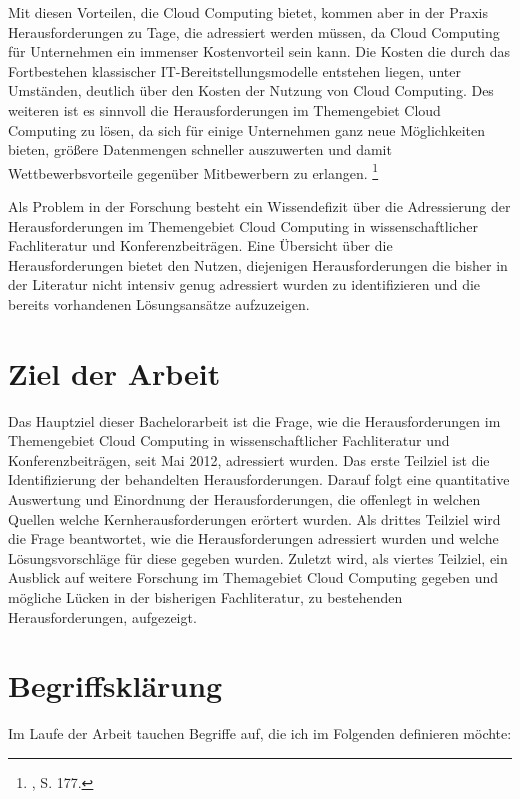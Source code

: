 \documentclass[
	a4paper,
	oneside,
	12pt,
	liststotocnumbered
]{article}
\let\cite\textcite
\begin{document}
Mit diesen Vorteilen, die Cloud Computing bietet, kommen aber in der Praxis Herausforderungen zu Tage, die adressiert werden müssen, da Cloud Computing für Unternehmen ein immenser Kostenvorteil sein kann. Die Kosten die durch das Fortbestehen klassischer IT-Bereitstellungsmodelle entstehen liegen, unter Umständen, deutlich über den Kosten der Nutzung von Cloud Computing. Des weiteren ist es sinnvoll die Herausforderungen im Themengebiet Cloud Computing zu lösen, da sich für einige Unternehmen ganz neue Möglichkeiten bieten, größere Datenmengen schneller auszuwerten und damit Wettbewerbsvorteile gegenüber Mitbewerbern zu erlangen.
\footnote{\cite{Marston.2011}, S. 177.}

Als Problem in der Forschung besteht ein Wissendefizit über die Adressierung der Herausforderungen im Themengebiet Cloud Computing in wissenschaftlicher Fachliteratur und Konferenzbeiträgen. Eine Übersicht über die Herausforderungen bietet den Nutzen, diejenigen Herausforderungen die bisher in der Literatur nicht intensiv genug adressiert wurden zu identifizieren und die bereits vorhandenen Lösungsansätze aufzuzeigen.



\section{Ziel der Arbeit}
Das Hauptziel dieser Bachelorarbeit ist die Frage, wie die Herausforderungen im Themengebiet Cloud Computing in wissenschaftlicher Fachliteratur und Konferenzbeiträgen, seit Mai 2012, adressiert wurden.
Das erste Teilziel ist die Identifizierung der behandelten Herausforderungen. Darauf folgt eine quantitative Auswertung und Einordnung der Herausforderungen, die offenlegt in welchen Quellen welche Kernherausforderungen erörtert wurden.
Als drittes Teilziel wird die Frage beantwortet, wie die Herausforderungen adressiert wurden und welche Lösungsvorschläge für diese gegeben wurden. Zuletzt wird, als viertes Teilziel, ein Ausblick auf weitere Forschung im Themagebiet Cloud Computing gegeben und mögliche Lücken in der bisherigen Fachliteratur, zu bestehenden Herausforderungen, aufgezeigt.


\section{Begriffsklärung}
Im Laufe der Arbeit tauchen Begriffe auf, die ich im Folgenden definieren möchte:

\end{document}
